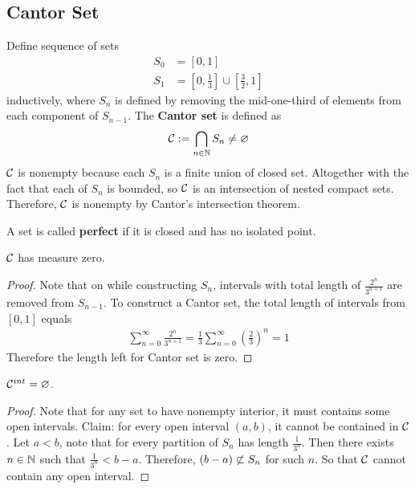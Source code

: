 \documentclass[11pt]{article}
\begin{document}
	\subsection{Cantor Set}
	\begin{definition}
		Define sequence of sets 
		\begin{align}
			S_0 &= [0, 1] \\
			S_1 &= [0, \frac{1}{3}] \cup [\frac{3}{2}, 1]
		\end{align}
		inductively, where $S_n$ is defined by removing the mid-one-third of elements from each component of $S_{n-1}$. The \textbf{Cantor set} is defined as
		\begin{align}
			\mathcal{{C}} := \bigcap_{n \in \mathbb{N}} S_n \neq \varnothing
		\end{align}
		$\mathcal{{C}}$ is nonempty because each $S_n$ is a finite union of closed set. Altogether with the fact that each of $S_n$ is bounded, so $\mathcal{{C}}$ is an intersection of nested compact sets. Therefore, $\mathcal{{C}}$ is nonempty by Cantor's intersection theorem.
	\end{definition}
	
	\begin{definition}
		A set is called \textbf{perfect} if it is closed and has no isolated point.
	\end{definition}
	
	\begin{proposition}
		$\mathcal{{C}}$ has measure zero.
	\end{proposition}
	
	\begin{proof}
		Note that on while constructing $S_n$, intervals with total length of $\frac{2^n}{3^{n+1}}$ are removed from $S_{n-1}$. To construct a Cantor set, the total length of intervals from $[0, 1]$ equals
		\begin{align}
			\sum_{n=0}^\infty \frac{2^n}{3^{n+1}} = \frac{1}{3} \sum_{n=0}^\infty \left(\frac{2}{3}\right)^n = 1
		\end{align}
		Therefore the length left for Cantor set is zero.
	\end{proof}

	\begin{proposition}
		$\mathcal{{C}}^{int} = \varnothing$.
	\end{proposition}
	
	\begin{proof}
		Note that for any set to have nonempty interior, it must contains some open intervals. Claim: for every open interval $(a, b)$, it cannot be contained in $\mathcal{{C}}$. Let $a < b$, note that for every partition of $S_n$ has length $\frac{1}{3^n}$. Then there exists $n \in \mathbb{N}$ such that $\frac{1}{3^n} < b - a$. Therefore, $(b - a) \centernot \subset S_n$ for such $n$. So that $\mathcal{{C}}$ cannot contain any open interval.
	\end{proof}
	
\end{document}
